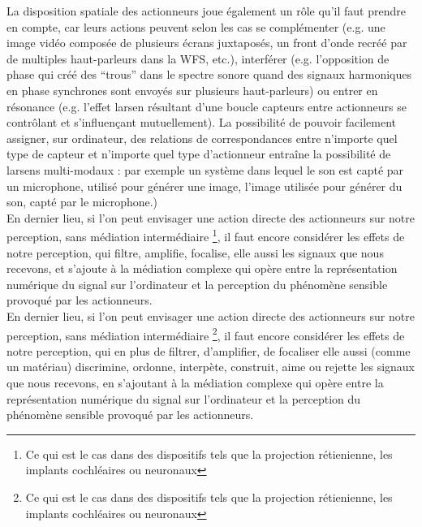 \indent La disposition spatiale des actionneurs joue également un rôle qu'il faut prendre en compte, car leurs actions peuvent selon les cas se complémenter (e.g. une image vidéo composée de plusieurs écrans juxtaposés, un front d'onde recréé par de multiples haut-parleurs dans la \gls{WFS}, etc.), interférer (e.g. l'opposition de phase qui créé des ``trous'' dans le spectre sonore quand des signaux harmoniques en phase synchrones sont envoyés sur plusieurs haut-parleurs) ou entrer en résonance (e.g. l'effet larsen résultant d'une boucle capteurs entre actionneurs se contrôlant et s'influençant mutuellement). La possibilité de pouvoir facilement assigner, sur ordinateur, des relations de correspondances entre n'importe quel type de capteur et n'importe quel type d'actionneur entraîne la possibilité de larsens multi-modaux : par exemple un système dans lequel le son est capté par un microphone, utilisé pour générer une image, l'image utilisée pour générer du son, capté par le microphone.)\\
\indent En dernier lieu, si l'on peut envisager une action directe des actionneurs sur notre perception, sans médiation intermédiaire \footnote{Ce qui est le cas dans des dispositifs tels que la projection rétienienne, les implants cochléaires ou neuronaux}, il faut encore considérer les effets de notre perception, qui filtre, amplifie, focalise, elle aussi les signaux que nous recevons, et s'ajoute à la médiation complexe qui opère entre la représentation numérique du signal sur l'ordinateur et la perception du phénomène sensible provoqué par les actionneurs.\\
\indent En dernier lieu, si l'on peut envisager une action directe des actionneurs sur notre perception, sans médiation intermédiaire \footnote{Ce qui est le cas dans des dispositifs tels que la projection rétienienne, les implants cochléaires ou neuronaux}, il faut encore considérer les effets de notre perception, qui en plus de filtrer, d'amplifier, de focaliser elle aussi (comme un matériau) discrimine, ordonne, interpète, construit, aime ou rejette les signaux que nous recevons, en s'ajoutant à la médiation complexe qui opère entre la représentation numérique du signal sur l'ordinateur et la perception du phénomène sensible provoqué par les actionneurs.\\
